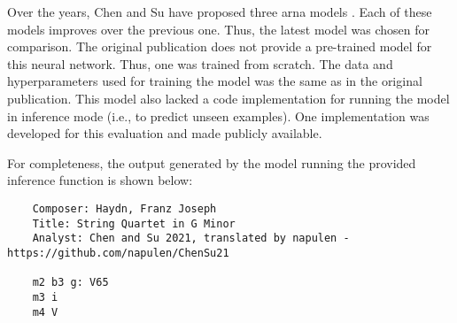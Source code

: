 
Over the years, Chen and Su have proposed three \gls{arna}
models \parencite{chen2018functional, chen2019harmony,
chen2021attend}. Each of these models improves over the
previous one. Thus, the latest model
\parencite{chen2021attend} was chosen for comparison. The
original publication does not provide a pre-trained model
for this neural network. Thus, one was trained from scratch.
The data and hyperparameters used for training the model was
the same as in the original publication. This model also
lacked a code implementation for running the model in
inference mode (i.e., to predict unseen examples). One
implementation was developed for this evaluation and made
publicly
available.

For completeness, the output generated by the model running the provided inference function is shown below:

\begin{verbatim}
    Composer: Haydn, Franz Joseph
    Title: String Quartet in G Minor
    Analyst: Chen and Su 2021, translated by napulen - https://github.com/napulen/ChenSu21

    m2 b3 g: V65
    m3 i
    m4 V
\end{verbatim}
